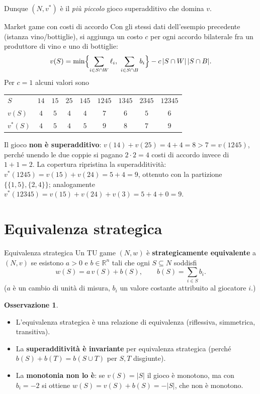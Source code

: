 \documentclass[12pt,a4paper,twoside]{book}
\theoremstyle{plain}
\theoremstyle{definition}
\newtheorem{remark}[theorem]{Osservazione}
\begin{document}
Dunque $(N,v^*)$ è il \emph{più piccolo} gioco superadditivo che domina $v$.

\begin{exbox}{Market game con costi di accordo}
Con gli stessi dati dell'esempio precedente (istanza vino/bottiglie), si aggiunga un costo $c$ per ogni accordo bilaterale fra un produttore di vino e uno di bottiglie:
\[ v(S)=\min\Bigl\{\sum_{i\in S\cap W}\ell_i,\ \sum_{i\in S\cap B}b_i\Bigr\}-c\,|S\cap W|\,|S\cap B|. \]
Per $c=1$ alcuni valori sono
\begin{center}
\begin{tabular}{lcccccccc}
\toprule
$S$      & $14$ & $15$ & $25$ & $145$ & $1245$ & $1345$ & $2345$ & $12345$\\
$v(S)$   & $4$  & $5$  & $4$  & $4$   & $7$    & $6$    & $5$    & $6$\\
$v^*(S)$ & $4$  & $5$  & $4$  & $5$   & $9$    & $8$    & $7$    & $9$\\
\bottomrule
\end{tabular}
\end{center}
Il gioco \textbf{non è superadditivo}: $v(14)+v(25)=4+4=8>7=v(1245)$, perché unendo le due coppie si pagano $2\cdot2=4$ costi di accordo invece di $1+1=2$. La copertura ripristina la superadditività: $v^*(1245)=v(15)+v(24)=5+4=9$, ottenuto con la partizione $\{\{1,5\},\{2,4\}\}$; analogamente $v^*(12345)=v(15)+v(24)+v(3)=5+4+0=9$.
\end{exbox}

\section{Equivalenza strategica}

\begin{defbox}{Equivalenza strategica}
Un TU game $(N,w)$ è \textbf{strategicamente equivalente} a $(N,v)$ se esistono $a>0$ e $b\in\mathbb{R}^n$ tali che ogni $S\subseteq N$ soddisfi
\[ w(S)=a\,v(S)+b(S),\qquad b(S)=\sum_{i\in S}b_i. \]
($a$ è un cambio di unità di misura, $b_i$ un valore costante attribuito al giocatore $i$.)
\end{defbox}

\begin{remark}
\begin{itemize}
  \item L'equivalenza strategica è una relazione di equivalenza (riflessiva, simmetrica, transitiva).
  \item La \textbf{superadditività è invariante} per equivalenza strategica (perché $b(S)+b(T)=b(S\cup T)$ per $S,T$ disgiunte).
  \item La \textbf{monotonia non lo è}: se $v(S)=|S|$ il gioco è monotono, ma con $b_i=-2$ si ottiene $w(S)=v(S)+b(S)=-|S|$, che non è monotono.
\end{itemize}
\end{remark}
\end{document}
